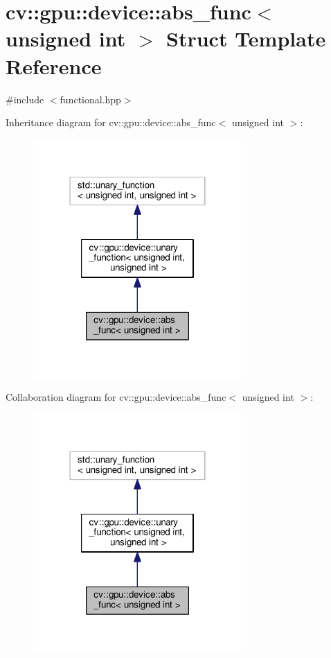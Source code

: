 \hypertarget{structcv_1_1gpu_1_1device_1_1abs__func_3_01unsigned_01int_01_4}{\section{cv\-:\-:gpu\-:\-:device\-:\-:abs\-\_\-func$<$ unsigned int $>$ Struct Template Reference}
\label{structcv_1_1gpu_1_1device_1_1abs__func_3_01unsigned_01int_01_4}
}


{\ttfamily \#include $<$functional.\-hpp$>$}



Inheritance diagram for cv\-:\-:gpu\-:\-:device\-:\-:abs\-\_\-func$<$ unsigned int $>$\-:\nopagebreak
\begin{figure}[H]
\begin{center}
\leavevmode
\includegraphics[width=226pt]{structcv_1_1gpu_1_1device_1_1abs__func_3_01unsigned_01int_01_4__inherit__graph}
\end{center}
\end{figure}


Collaboration diagram for cv\-:\-:gpu\-:\-:device\-:\-:abs\-\_\-func$<$ unsigned int $>$\-:\nopagebreak
\begin{figure}[H]
\begin{center}
\leavevmode
\includegraphics[width=226pt]{structcv_1_1gpu_1_1device_1_1abs__func_3_01unsigned_01int_01_4__coll__graph}
\end{center}
\end{figure}

